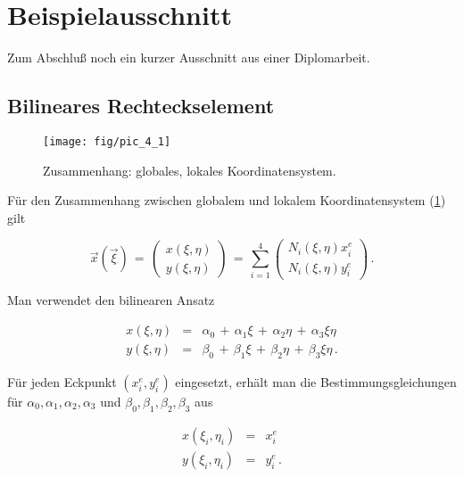 \section{Beispielausschnitt}

Zum Abschluß noch ein kurzer Ausschnitt aus einer Diplomarbeit.

\subsection{Bilineares Rechteckselement \label{Bilinear}}

\begin{figure}[tb]
\begin{center}
\texttt{[image: fig/pic\_4\_1]}
\caption{Zusammenhang: globales, lokales Koordinatensystem.}
\label{fig:KoordSysteme}
\end{center}
\end{figure}

Für den Zusammenhang zwischen globalem und lokalem Koordinatensystem (\ref{fig:KoordSysteme}) gilt

\begin{equation}
\vec{x}\left(\vec{\xi}\right)\,=\,
\left( \begin{array}{c}
x(\xi,\eta)\\
y(\xi,\eta) \end{array} \right)
\,=\,\sum_{i=1}^{4}
\left( \begin{array}{c}
N_i(\xi,\eta)x_i^e \\
N_i(\xi,\eta)y_i^e \end{array} \right)\,.
\end{equation}

Man verwendet den bilinearen Ansatz

\begin{eqnarray}
x(\xi,\eta)&=&\alpha_0\,+\,\alpha_1\xi\,+\,\alpha_2\eta\,+\,\alpha_3\xi\eta
\nonumber\\
y(\xi,\eta)&=&\beta_0\,+\,\beta_1\xi\,+\,\beta_2\eta\,+\,\beta_3\xi\eta\,.
\end{eqnarray}

Für jeden Eckpunkt $(x_i^e,y_i^e)$ eingesetzt, erhält man die
Bestimmungsgleichungen für \linebreak $\alpha_0,\alpha_1,\alpha_2,\alpha_3$
und $ \beta_0,\beta_1,\beta_2,\beta_3  $ aus

\begin{eqnarray}
 x(\xi_i,\eta_i)&=&x_i^e \nonumber\\
 y(\xi_i,\eta_i)&=&y_i^e\,.
\end{eqnarray}


